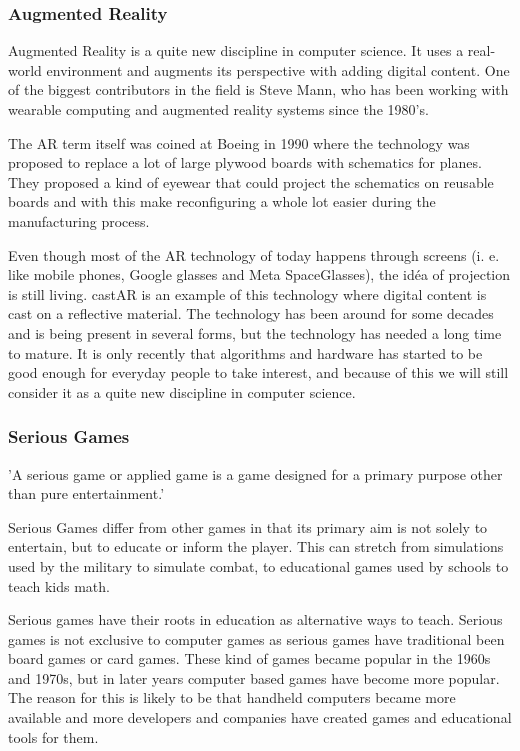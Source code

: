 \subsubsection{Augmented Reality}

\gls{Augmented Reality} is a quite new discipline in computer science. It uses
a real-world environment and augments its perspective with adding digital
content. One of the biggest contributors in the field is Steve Mann, who has been
working with wearable computing and augmented reality systems since the 1980's.

The \gls{AR} term itself was coined at Boeing\cite{boeingAR} in 1990 where the
technology was
proposed to replace a lot of large plywood boards with schematics for planes.
They proposed a kind of eyewear that could project the schematics on reusable
boards and with this make reconfiguring a whole lot easier during the
manufacturing process.

Even though most of the AR technology of today happens through screens (i. e. like
mobile phones, Google glasses\cite{GoogleGlasses} and Meta SpaceGlasses\cite{MetaSpaceGlasses}),
the id\'{e}a of projection is still living. castAR is an example of this 
technology where digital content is cast on a reflective material.
The technology has been around for some decades and is being present in several
forms, but the technology has needed a long time to mature. It is only recently
that algorithms and hardware has started to be good enough for everyday people
to take interest, and because of this we will still consider it as a quite new 
discipline in computer science.

\subsubsection{Serious Games}

'A serious game or applied game is a game designed for a primary purpose other than pure entertainment.'\cite{wiki:SeriousGames}

Serious Games differ from other games in that its primary aim is not solely to entertain, but to educate or inform the player.
This can stretch from simulations used by the military to simulate combat, to educational games used by schools to teach kids math.

Serious games have their roots in education as alternative ways to teach.
Serious games is not exclusive to computer games as serious games have traditional been board games or card games.
These kind of games became popular in the 1960s and 1970s, but in later years computer based games have become more 
popular. The reason for this is likely to be that handheld computers became more available and more developers and companies have created games and educational tools for them.

